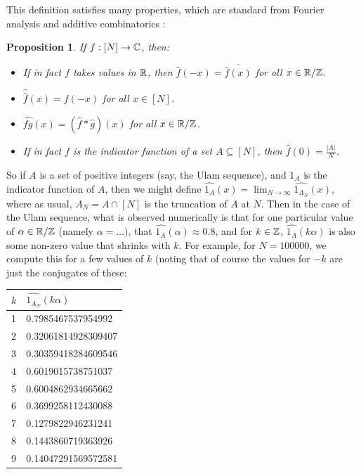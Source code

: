 \documentclass{article}
\newtheorem{proposition}[theorem]{Proposition}
\theoremstyle{definition}
\theoremstyle{remark}
\numberwithin{equation}{section}
\begin{document}
This definition satisfies many properties, which are standard from
Fourier analysis and additive combinatorics \cite{additive_combinatorics_tao}:

\begin{proposition}
If $f : [N] \to \mathbb{C}$, then: 

\begin{itemize}
\item If in fact $f$ takes values in $\mathbb{R}$, then
  $\widehat{f}(-x) = \overline{\widehat{f}(x)}$ for all $x \in \mathbb{R}/\mathbb{Z}$.

\item $\widehat{\widehat{f}}(x) = f(-x)$ for all $x \in [N]$.

\item $\widehat{fg}(x) = (\widehat{f} \ast \widehat{g})(x)$ for all
  $x \in \mathbb{R}/\mathbb{Z}$.

\item If in fact $f$ is the indicator function of a set
  $A \subseteq [N]$, then $\widehat{f}(0) = \frac{|A|}{N}$.
\end{itemize}
\end{proposition}

So if $A$ is a set of positive integers (say, the Ulam sequence), and
$1_A$ is the indicator function of $A$, then we might define
$\widehat{1_A}(x) = \lim_{N \to \infty} \widehat{1_{A_N}}(x)$, where
as usual, $A_N = A \cap [N]$ is the truncation of $A$ at $N$.  Then in
the case of the Ulam sequence, what is observed numerically is that
for one particular value of $\alpha \in \mathbb{R}/\mathbb{Z}$ (namely
$\alpha = \ldots)$, that $\widehat{1_A}(\alpha) \approx 0.8$, and for
$k \in \mathbb{Z}$, $\widehat{1_A}(k \alpha)$ is also some non-zero value that
shrinks with $k$.  For example, for $N = 100000$, we compute this for
a few values of $k$ (noting that of course the values for $-k$ are
just the conjugates of these:

\begin{tabular}{|ll|}
\hline
$k$ & $\widehat{1_{A_N}}(k\alpha)$\\
\hline
1 & 0.7985467537954992\\
2 & 0.32061814928309407\\
3 & 0.30359418284609546\\
4 & 0.6019015738751037\\
5 & 0.6004862934665662\\
6 & 0.3699258112430088\\
7 & 0.1279822946231241 \\
8 & 0.1443860719363926 \\
9 & 0.14047291569572581\\
\hline
\end{tabular}
\end{document}
